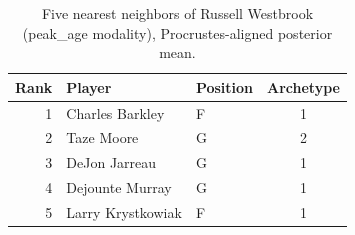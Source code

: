\begin{table}[htbp]
  \centering\small
  \begin{tabular}{rllc}
    \toprule
    Rank & Player & Position & Archetype \\
    \midrule
    1 & Charles Barkley & F & 1 \\
    2 & Taze Moore & G & 2 \\
    3 & DeJon Jarreau & G & 1 \\
    4 & Dejounte Murray & G & 1 \\
    5 & Larry Krystkowiak & F & 1 \\
    \bottomrule
  \end{tabular}
  \caption{Five nearest neighbors of Russell Westbrook (peak_age modality), Procrustes-aligned posterior mean.}
  \label{tab:Russell_Westbrook_neighbors_peak_age}
\end{table}

